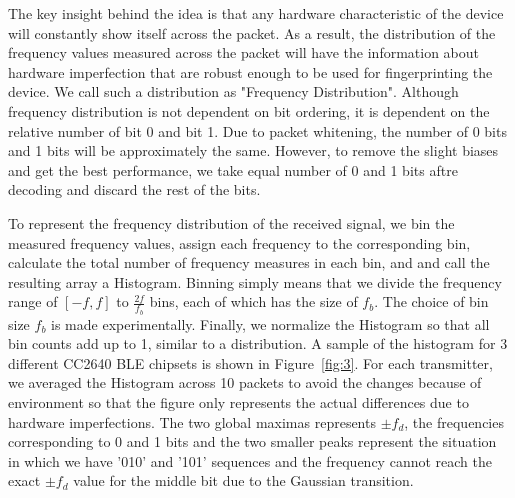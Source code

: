 The key insight behind the idea is that any hardware characteristic of the device will constantly show itself across the packet. As a result, the distribution of the frequency values measured across the packet will have the information about hardware imperfection that are robust enough to be used for fingerprinting the device. We call such a distribution as "Frequency Distribution". Although frequency distribution is not dependent on bit ordering, it is dependent on the relative number of bit 0 and bit 1. Due to packet whitening, the number of 0 bits and 1 bits will be approximately the same. However, to remove the slight biases and get the best performance, we take equal number of 0 and 1 bits aftre decoding and discard the rest of the bits.


To represent the frequency distribution of the received signal, we bin the measured frequency values, assign each frequency to the corresponding bin, calculate the total number of frequency measures in each bin, and and call the resulting array a Histogram. Binning simply means that we divide the frequency range of $[-f,f]$ to $\frac{2f}{f_b}$ bins, each of which has the size of $f_b$. The choice of bin size $f_b$ is made experimentally. Finally, we normalize the Histogram so that all bin counts add up to 1, similar to a distribution. A sample of the histogram for 3 different CC2640 BLE chipsets is shown in Figure~\ref{fig:3}. For each transmitter, we averaged the Histogram across 10 packets to avoid the changes because of environment so that the figure only represents the actual differences due to hardware imperfections. The two global maximas represents $\pm f_d$, the frequencies corresponding to 0 and 1 bits and the two smaller peaks represent the situation in which we have '010' and '101' sequences and the frequency cannot reach the exact $\pm f_d$ value for the middle bit due to the Gaussian transition. 

